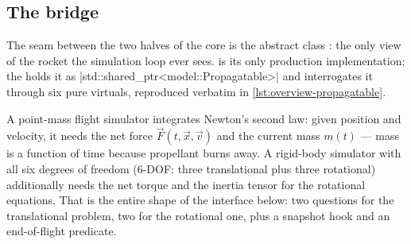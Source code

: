 
\subsection{The  bridge}\label{sec:overview-bridge}

The seam between the two halves of the core is the abstract class
 : the only view of the rocket the
simulation loop ever sees.  is its only production implementation; the
 holds it as \cppinline|std::shared_ptr<model::Propagatable>|
 and interrogates it through six pure virtuals, reproduced
verbatim in \cref{lst:overview-propagatable}.

\begin{physbox}
A point-mass flight simulator integrates Newton's second law: given position and velocity,
it needs the net force $\vec F(t, \vec x, \vec v)$ and the current mass $m(t)$ --- mass is
a function of time because propellant burns away. A rigid-body simulator with all six
degrees of freedom (6-DOF: three translational plus three rotational) additionally needs
the net torque and the inertia tensor for the rotational equations. That is the entire
shape of the interface below: two questions for the translational problem, two for the
rotational one, plus a snapshot hook and an end-of-flight predicate.
\end{physbox}

